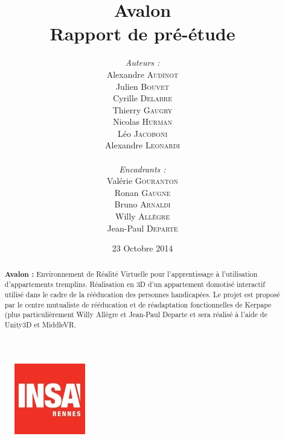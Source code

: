 \documentclass[a4paper,11pt]{article}
\title{
  \textbf{Avalon}\\
  Rapport de pré-étude
}
\author{
\begin{minipage}{0.4\textwidth}
	\begin{flushleft} \large
		\emph{Auteurs :}\\
		Alexandre \textsc{Audinot}\\
		Julien \textsc{Bouvet}\\
		Cyrille \textsc{Delabre}\\
		Thierry \textsc{Gaugry}\\
		Nicolas \textsc{Hurman}\\
		Léo \textsc{Jacoboni}\\
		Alexandre \textsc{Leonardi}\\
	\end{flushleft}
\end{minipage}
\begin{minipage}{0.4\textwidth}
	\begin{flushright} \large
		\emph{Encadrants :} \\
		Valérie \textsc{Gouranton}\\
		Ronan \textsc{Gaugne}\\
		Bruno \textsc{Arnaldi}\\
		Willy \textsc{Allègre}\\
		Jean-Paul  \textsc{Departe}\\
	\end{flushright}
\end{minipage}
}
\date{23 Octobre 2014}
\begin{document}
\maketitle
\thispagestyle{empty}
\begin{abstract}
\textbf{Avalon :} Environnement de Réalité Virtuelle pour l'apprentissage à l'utilisation d'appartements tremplins. Réalisation en 3D d'un appartement domotisé interactif utilisé dans le cadre de la rééducation des personnes handicapées.
Le projet est proposé par le centre mutualiste de rééducation et de réadaptation fonctionnelles de Kerpape (plus particulièrement Willy Allègre et Jean-Paul Departe et sera réalisé à l'aide de Unity3D et MiddleVR.
\end{abstract}

\vfill

\begin{figure}
   \begin{minipage}{0.3\linewidth}
      \includegraphics[width=\textwidth]{1-PreEtude/img/logo_insa.jpeg}
   \end{minipage} \hfill
   \begin{minipage}{0.3\linewidth}

\end{minipage}
\end{figure}
\end{document}
